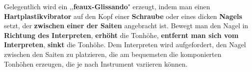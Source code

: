 \documentclass[12pt]{article}
\newcommand*\circled[1]{\tikz[baseline=(char.base)]{
            \node[shape=circle,draw,inner sep=1pt] (char) {#1};}}
\begin{document}
\textbf{\circled{2}} Gelegentlich wird ein ,,\textbf{feaux-Glissando}" erzeugt, indem man einen \textbf{Hartplastikvibrator} auf den Kopf einer \textbf{Schraube} oder eines dicken \textbf{Nagels} setzt, der \textbf{zwischen einer der Saiten} angebracht ist. Bewegt man den Nagel in \textbf{Richtung des Interpreten}, \textbf{erhöht} die Tonhöhe, \textbf{entfernt man sich vom Interpreten}, \textbf{sinkt} die Tonhöhe. Dem Interpreten wird aufgefordert, den Nagel zwischen den Saiten zu platzieren, die am bequemsten die komponierten Tonhöhen erzeugen, die je nach Instrument variieren können.

\endgroup
\end{document}

